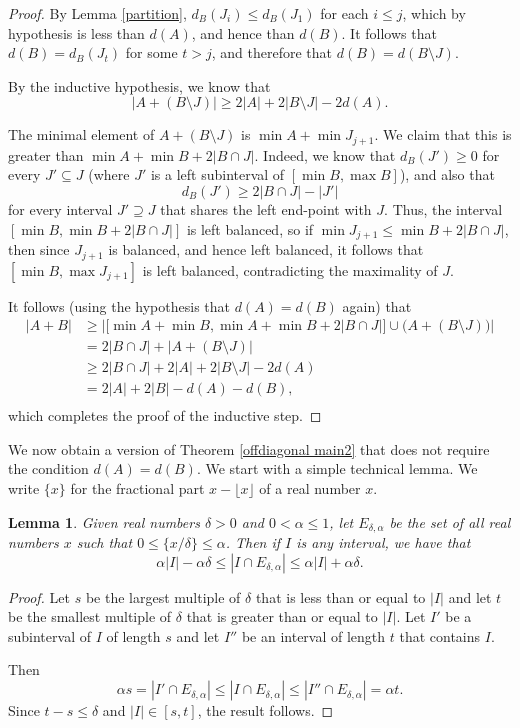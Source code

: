 \documentclass[11pt,reqno]{amsart}
\newtheorem{lemma}[theorem]{Lemma}
\theoremstyle{definition}
\def\a{\alpha}
\def\d{\delta}
\def\subset{\subseteq}
\def\supset{\supseteq}
\begin{document}
\begin{proof}
By Lemma \ref{partition}, $d_B(J_i)\leq d_B(J_1)$ for each $i\leq j$, which by hypothesis is less than $d(A)$, and hence than $d(B)$. It follows that $d(B)=d_B(J_t)$ for some $t>j$, and therefore that $d(B)=d(B\setminus J)$. 

By the inductive hypothesis, we know that
\[|A+(B\setminus J)|\geq 2|A|+2|B\setminus J|-2d(A).\]

The minimal element of $A+(B\setminus J)$ is $\min A+\min J_{j+1}$. We claim that this is greater than $\min A+\min B+2|B\cap J|$. Indeed, we know that $d_B(J')\geq 0$ for every $J'\subset J$ (where $J'$ is a left subinterval of $[\min B,\max B]$), and also that 
\[d_B(J')\geq 2|B\cap J|-|J'|\]
for every interval $J'\supset J$ that shares the left end-point with $J$. Thus, the interval $[\min B,\min B+2|B\cap J|]$ is left balanced, so if $\min J_{j+1}\leq\min B+2|B\cap J|$, then since $J_{j+1}$ is balanced, and hence left balanced, it follows that $[\min B,\max J_{j+1}]$ is left balanced, contradicting the maximality of $J$. 

It follows (using the hypothesis that $d(A)=d(B)$ again) that
\begin{align*}
|A+B|&\geq \big|\big[\min A+\min B,\min A+\min B+2|B\cap J|\big]\cup\big(A+(B\setminus J)\big)\big|\\
&=2|B\cap J|+|A+(B\setminus J)|\\
&\geq 2|B\cap J|+2|A|+2|B\setminus J|-2d(A)\\
&=2|A|+2|B|-d(A)-d(B),\\
\end{align*}
which completes the proof of the inductive step.
\end{proof}

We now obtain a version of Theorem \ref{offdiagonal main2} that does not require the condition $d(A)=d(B)$. We start with a simple technical lemma. We write $\{x\}$ for the fractional part $x-\lfloor x\rfloor$ of a real number $x$.

\begin{lemma} \label{reduce d}
    Given real numbers $\d>0$ and $0<\a\leq 1$, let $E_{\d,\a}$ be the set of all real numbers $x$ such that $0\leq\{x/\d\}\leq\a$. Then if $I$ is any interval, we have that
    \[\a|I|-\a\d\leq|I\cap E_{\d,\a}|\leq\a|I|+\a\d.\]
\end{lemma}

\begin{proof}
Let $s$ be the largest multiple of $\d$ that is less than or equal to $|I|$ and let $t$ be the smallest multiple of $\d$ that is greater than or equal to $|I|$. Let $I'$ be a subinterval of $I$ of length $s$ and let $I''$ be an interval of length $t$ that contains $I$. 

Then 
\[\a s=|I'\cap E_{\d,\a}|\leq|I\cap E_{\d,\a}|\leq|I''\cap E_{\d,\a}|=\a t.\]
Since $t-s\leq \d$ and $|I|\in[s,t]$, the result follows.
\end{proof}
\end{document}
